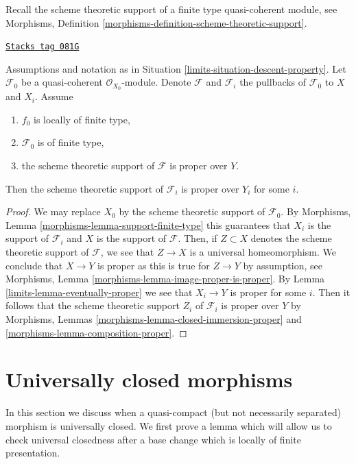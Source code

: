 Recall the scheme theoretic support of
a finite type quasi-coherent module, see
Morphisms, Definition \ref{morphisms-definition-scheme-theoretic-support}.

\begin{lemma}
\label{limits-lemma-eventually-proper-support}
\href{https://stacks.math.columbia.edu/tag/081G}{\texttt{Stacks tag 081G}}

Assumptions and notation as in Situation \ref{limits-situation-descent-property}.
Let $\mathcal{F}_0$ be a quasi-coherent $\mathcal{O}_{X_0}$-module.
Denote $\mathcal{F}$ and $\mathcal{F}_i$ the pullbacks of
$\mathcal{F}_0$ to $X$ and $X_i$. Assume
\begin{enumerate}
\item $f_0$ is locally of finite type,
\item $\mathcal{F}_0$ is of finite type,
\item the scheme theoretic support of $\mathcal{F}$ is proper over $Y$.
\end{enumerate}
Then the scheme theoretic support of $\mathcal{F}_i$ is proper over $Y_i$
for some $i$.
\end{lemma}

\begin{proof}

We may replace $X_0$ by the scheme theoretic support of $\mathcal{F}_0$.
By Morphisms, Lemma \ref{morphisms-lemma-support-finite-type} this
guarantees that $X_i$ is the support of $\mathcal{F}_i$ and $X$ is the
support of $\mathcal{F}$. Then, if $Z \subset X$ denotes the scheme
theoretic support of $\mathcal{F}$, we see that $Z \to X$ is a universal
homeomorphism. We conclude that $X \to Y$ is proper as this is true for
$Z \to Y$ by assumption, see
Morphisms, Lemma \ref{morphisms-lemma-image-proper-is-proper}.
By Lemma \ref{limits-lemma-eventually-proper} we see that $X_i \to Y$ is proper
for some $i$. Then it follows that the scheme theoretic support $Z_i$ of
$\mathcal{F}_i$ is proper over $Y$ by
Morphisms, Lemmas \ref{morphisms-lemma-closed-immersion-proper} and
\ref{morphisms-lemma-composition-proper}.
\end{proof}

\section{Universally closed morphisms}
\label{limits-section-universally-closed}
In this section we discuss when a quasi-compact (but not necessarily
separated) morphism is universally closed. We first prove a lemma which
will allow us to check universal closedness after a base change
which is locally of finite presentation.

